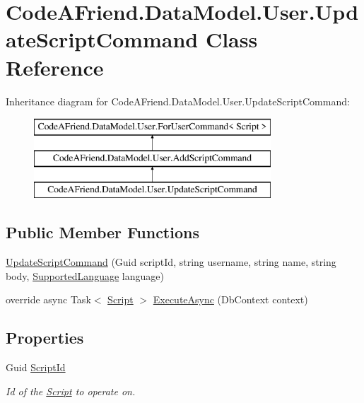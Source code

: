 \hypertarget{class_code_a_friend_1_1_data_model_1_1_user_1_1_update_script_command}{}\section{Code\+A\+Friend.\+Data\+Model.\+User.\+Update\+Script\+Command Class Reference}
\label{class_code_a_friend_1_1_data_model_1_1_user_1_1_update_script_command}


 


Inheritance diagram for Code\+A\+Friend.\+Data\+Model.\+User.\+Update\+Script\+Command\+:\begin{figure}[H]
\begin{center}
\leavevmode
\includegraphics[height=3.000000cm]{class_code_a_friend_1_1_data_model_1_1_user_1_1_update_script_command}
\end{center}
\end{figure}
\subsection*{Public Member Functions}
\begin{DoxyCompactItemize}
\item 
\mbox{\hyperlink{class_code_a_friend_1_1_data_model_1_1_user_1_1_update_script_command_a4cf4c6d1cbdb87cba9b4c38fb5b0e900}{Update\+Script\+Command}} (Guid script\+Id, string username, string name, string body, \mbox{\hyperlink{namespace_code_a_friend_1_1_data_model_a13e088c525db1b03a4de75420ced79b2}{Supported\+Language}} language)
\item 
override async Task$<$ \mbox{\hyperlink{class_code_a_friend_1_1_data_model_1_1_script}{Script}} $>$ \mbox{\hyperlink{class_code_a_friend_1_1_data_model_1_1_user_1_1_update_script_command_a54e74e6d68bfc5e01cbcc96fd6dfbd2d}{Execute\+Async}} (Db\+Context context)
\end{DoxyCompactItemize}
\subsection*{Properties}
\begin{DoxyCompactItemize}
\item 
Guid \mbox{\hyperlink{class_code_a_friend_1_1_data_model_1_1_user_1_1_update_script_command_a5f8fe92856201f191887693214d7383f}{Script\+Id}}
\begin{DoxyCompactList}\small\item\em Id of the \mbox{\hyperlink{class_code_a_friend_1_1_data_model_1_1_script}{Script}} to operate on.\end{DoxyCompactList}\end{DoxyCompactItemize}
